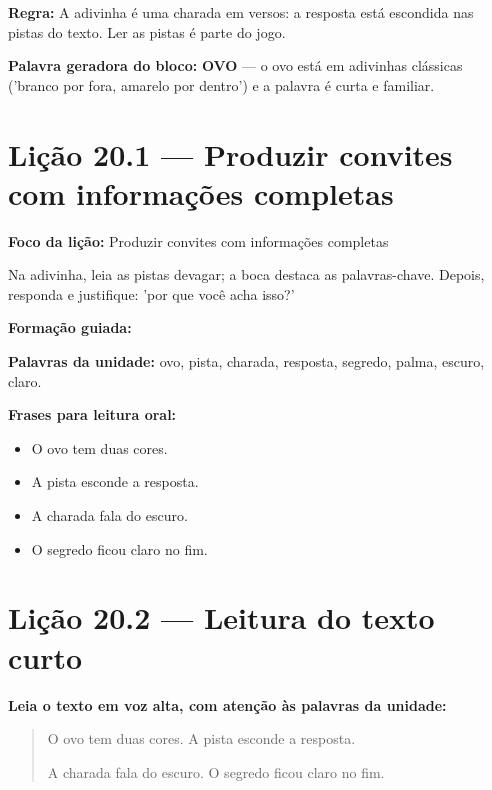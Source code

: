 \textbf{Regra:} A adivinha é uma charada em versos: a resposta está escondida nas pistas do texto. Ler as pistas é parte do jogo.

\textbf{Palavra geradora do bloco:} \textbf{OVO} --- o ovo está em adivinhas clássicas ('branco por fora, amarelo por dentro') e a palavra é curta e familiar.

\section{Lição 20.1 --- Produzir convites com informações completas}

\textbf{Foco da lição:} Produzir convites com informações completas


\begin{boquinha}
Na adivinha, leia as pistas devagar; a boca destaca as palavras-chave. Depois, responda e justifique: 'por que você acha isso?'
\end{boquinha}

\noindent\textbf{Formação guiada:}

\begin{center}
\end{center}

\noindent\textbf{Palavras da unidade:} ovo, pista, charada, resposta, segredo, palma, escuro, claro.

\noindent\textbf{Frases para leitura oral:}
\begin{itemize}[leftmargin=1.6em]
  \item O ovo tem duas cores.
  \item A pista esconde a resposta.
  \item A charada fala do escuro.
  \item O segredo ficou claro no fim.
\end{itemize}

\section{Lição 20.2 --- Leitura do texto curto}

\noindent\textbf{Leia o texto em voz alta, com atenção às palavras da unidade:}


\begin{quote}
O ovo tem duas cores. A pista esconde a resposta.

A charada fala do escuro. O segredo ficou claro no fim.
\end{quote}

